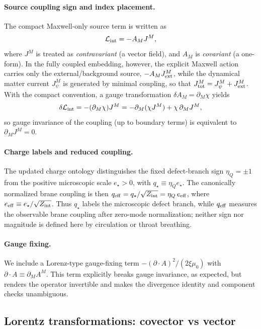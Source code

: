 \documentclass[11pt]{article}
\newcommand{\A}{A}
\newcommand{\J}{J}
\newcommand{\Zint}{Z_{\rm int}} %
\newcommand{\etaQ}{\eta_Q}
\newcommand{\estar}{e_\star}
\newcommand{\qstar}{q_\star}
\newcommand{\eeff}{e_{\rm eff}}
\newcommand{\qeff}{q_{\rm eff}}
\newcommand{\Jpsi}{J_\psi}
\newcommand{\Jext}{J_{\rm ext}}
\newcommand{\Jtot}{J_{\rm tot}}
\newcommand{\muo}{\mu_0}
\newcommand{\xigf}{\xi}
\begin{document}
\paragraph{Source coupling sign and index placement.}
The compact Maxwell-only source term is written as
\begin{equation}
  \mathcal L_{\rm int} = -\A_M \J^M,
\end{equation}
where \(\J^M\) is treated as \emph{contravariant} (a vector field), and \(\A_M\)
is \emph{covariant} (a one-form). In the fully coupled embedding, however, the
explicit Maxwell action carries only the external/background source,
\(-\A_M\Jext^M\), while the dynamical matter current \(\Jpsi^M\) is generated by
minimal coupling, so that \(\Jtot^M=\Jpsi^M+\Jext^M\). With the compact
convention, a gauge transformation \(\delta \A_M=\partial_M\chi\) yields
\begin{equation}
  \delta \mathcal L_{\rm int}
  = -(\partial_M\chi)\J^M
  = -\partial_M(\chi\J^M)+\chi\,\partial_M\J^M,
\end{equation}
so gauge invariance of the coupling (up to boundary terms) is equivalent to
\(\partial_M\J^M=0\).

\paragraph{Charge labels and reduced coupling.}
The updated charge ontology distinguishes the fixed defect-branch sign
\(\etaQ=\pm1\) from the positive microscopic scale \(\estar>0\), with
\(\qstar\equiv\etaQ\estar\). The canonically normalized brane coupling is then
\(\qeff=\qstar/\sqrt{\Zint}=\etaQ\,\eeff\), where
\(\eeff\equiv\estar/\sqrt{\Zint}\). Thus \(\qstar\) labels the microscopic defect
branch, while \(\qeff\) measures the observable brane coupling after zero-mode
normalization; neither sign nor magnitude is defined here by circulation or throat
breathing.

\paragraph{Gauge fixing.}
We include a Lorenz-type gauge-fixing term
\(-(\partial\!\cdot\!\A)^2/(2\xigf\muo)\) with
\(\partial\!\cdot\!\A\equiv\partial_M\A^M\). This term explicitly breaks gauge
invariance, as expected, but renders the operator invertible and makes the
divergence identity and component checks unambiguous.

\subsection{Lorentz transformations: covector vs vector}
\end{document}
